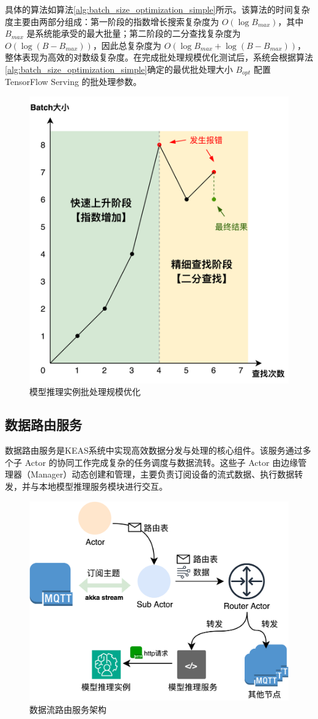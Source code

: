 具体的算法如算法\ref{alg:batch_size_optimization_simple}所示。该算法的时间复杂度主要由两部分组成：第一阶段的指数增长搜索复杂度为 $O(\log B_{max})$，其中 $B_{max}$ 是系统能承受的最大批量；第二阶段的二分查找复杂度为 $O(\log(B - B_{max}))$，因此总复杂度为 $O(\log B_{max} + \log(B - B_{max}))$，整体表现为高效的对数级复杂度。在完成批处理规模优化测试后，系统会根据算法\ref{alg:batch_size_optimization_simple}确定的最优批处理大小 $B_{opt}$ 配置 TensorFlow Serving 的批处理参数。

\begin{figure}[ht]
  \centering
  \includegraphics[width=0.6\linewidth]{pics/4-14批查找过程.png}
  \caption{模型推理实例批处理规模优化}
  \label{fig:4-14batch}
\end{figure}

\subsection{数据路由服务}

数据路由服务是KEAS系统中实现高效数据分发与处理的核心组件。该服务通过多个子 Actor 的协同工作完成复杂的任务调度与数据流转。这些子 Actor 由边缘管理器（Manager）动态创建和管理，主要负责订阅设备的流式数据、执行数据转发，并与本地模型推理服务模块进行交互。

\begin{figure}[ht]
  \centering
  \includegraphics[width=0.75\linewidth]{pics/4-6worker.png}
  \caption{数据流路由服务架构}
  \label{fig:data-routing-architecture}
\end{figure}

